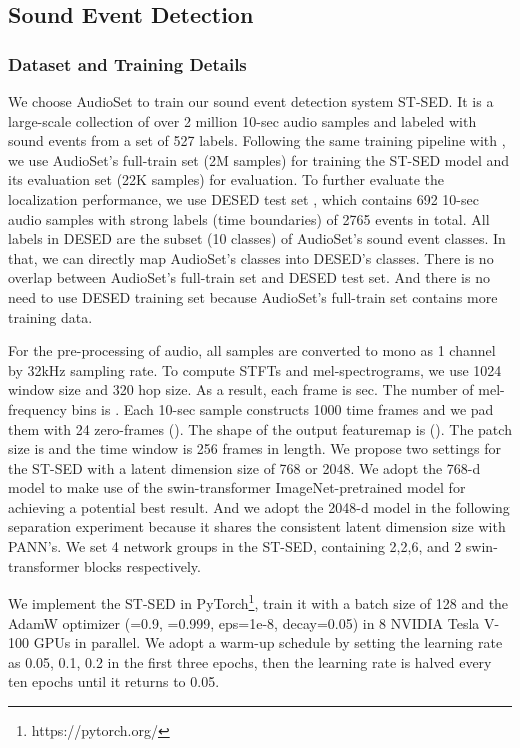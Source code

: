 \documentclass[letterpaper]{article} \usepackage{aaai22}  \usepackage{times}  \usepackage{helvet}  \usepackage{courier}  \usepackage[hyphens]{url}  \usepackage{graphicx} \urlstyle{rm} \def\UrlFont{\rm}  \usepackage{natbib}  \usepackage{caption} \DeclareCaptionStyle{ruled}{labelfont=normalfont,labelsep=colon,strut=off} \frenchspacing  \setlength{\pdfpagewidth}{8.5in}  \setlength{\pdfpageheight}{11in}  \usepackage{algorithm}
\begin{document}
\subsection{Sound Event Detection}
\subsubsection{Dataset and Training Details}
We choose AudioSet to train our sound event detection system ST-SED. It is a large-scale collection of over 2 million 10-sec audio samples and labeled with sound events from a set of 527 labels. Following the same training pipeline with \cite{ast}, we use AudioSet's full-train set (2M samples) for training the ST-SED model and its evaluation set (22K samples) for evaluation. To further evaluate the localization performance, we use DESED test set \cite{desed}, which contains 692 10-sec audio samples with strong labels (time boundaries) of 2765 events in total. All labels in DESED are the subset (10 classes) of AudioSet's sound event classes. In that, we can directly map AudioSet's classes into DESED's classes. There is no overlap between AudioSet's full-train set and DESED test set. And there is no need to use DESED training set because AudioSet's full-train set contains more training data. 

For the pre-processing of audio, all samples are converted to mono as 1 channel by 32kHz sampling rate. To compute STFTs and mel-spectrograms, we use 1024 window size and 320 hop size. As a result, each frame is  sec. The number of mel-frequency bins is . Each 10-sec sample constructs 1000 time frames and we pad them with 24 zero-frames (). The shape of the output featuremap is  (). The patch size is  and the time window is 256 frames in length. We propose two settings for the ST-SED with a latent dimension size  of 768 or 2048. We adopt the 768-d model to make use of the swin-transformer ImageNet-pretrained model for achieving a potential best result. And we adopt the 2048-d model in the following separation experiment because it shares the consistent latent dimension size with PANN's. We set 4 network groups in the ST-SED, containing 2,2,6, and 2 swin-transformer blocks respectively. 

We implement the ST-SED in PyTorch\footnote{https://pytorch.org/}, train it with a batch size of 128 and the AdamW optimizer (=0.9, =0.999, eps=1e-8, decay=0.05) \cite{adam} in 8 NVIDIA Tesla V-100 GPUs in parallel. We adopt a warm-up schedule by setting the learning rate as 0.05, 0.1, 0.2 in the first three epochs, then the learning rate is halved every ten epochs until it returns to 0.05. 
\end{document}
